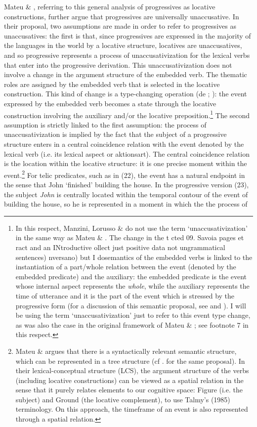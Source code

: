 \documentclass[output=paper]{langsci/langscibook}
\begin{document}
Mateu \& \citet{Amadas1999}, referring to this general analysis of progressives as locative constructions, further argue that progressives are universally unaccusative. In their proposal, two assumptions are made in order to refer to progressives as unaccusatives: the first is that, since progressives are expressed in the majority of the languages in the world by a locative structure, locatives are unaccusatives, and so progressive represents a process of unaccusativization for the lexical verbs that enter into the progressive derivation. This unaccusativization does not involve a change in the argument structure of the embedded verb. The thematic roles are assigned by the embedded verb that is selected in the locative construction. This kind of change is a type-changing operation (de \citealt{Swart1998}; \citealt{Fernald1999}): the event expressed by the embedded verb becomes a state through the locative construction involving the auxiliary and/or the locative preposition.\footnote{In this respect, Manzini, Lorusso \& \citet{Savoia2017} do not use the term ‘unaccusativization’ in the same way as Mateu \& \citet{Amadas1999}. The change in the   t  cted 09. Savoia pages et ract and an INtroductive ollect just positive data not ungrammatical sentences) nversano) but I dosemantics of the embedded verbs is linked to the instantiation of a part/whole relation between the event (denoted by the embedded predicate) and the auxiliary: the embedded predicate is the event whose internal aspect represents the \textit{whole}, while the auxiliary represents the time of utterance and it is the part of the event which is stressed by the progressive form (for a discussion of this semantic proposal, see \citealt{Higginbotham2009} and \citealt{Landman1992}). I will be using the term ‘unaccusativization’ just to refer to this event type change, as was also the case in the original framework of Mateu \& \citet{Amdas1999}; see footnote 7 in this respect.}  The second assumption is strictly linked to the first assumption: the process of unaccusativization is implied by the fact that the subject of a progressive structure enters in a central coincidence relation with the event denoted by the lexical verb (i.e. its lexical aspect or aktionsart). The central coincidence relation is the location within the locative structure: it is one precise moment within the event.\footnote{Mateu \& \citet{Amadas1999} argues that there is a syntactically relevant semantic structure, which can be represented in a tree structure (cf . \citealt{Bouchard1995} for the same proposal). In their lexical-conceptual structure (LCS), the argument structure of the verbs (including locative constructions) can be viewed as a spatial relation in the sense that it purely relates elements to our cognitive space: Figure (i.e. the subject) and Ground (the locative complement), to use Talmy’s (1985) terminology. On this approach, the timeframe of an event is also represented through a spatial relation.}  For telic predicates, such as in (22), the event has a natural endpoint in the sense that John ‘finished’ building the house. In the progressive version (23), the subject \textit{John} is centrally located within the temporal contour of the event of building the house, so he is represented in a moment in which the the process of 
\end{document}
